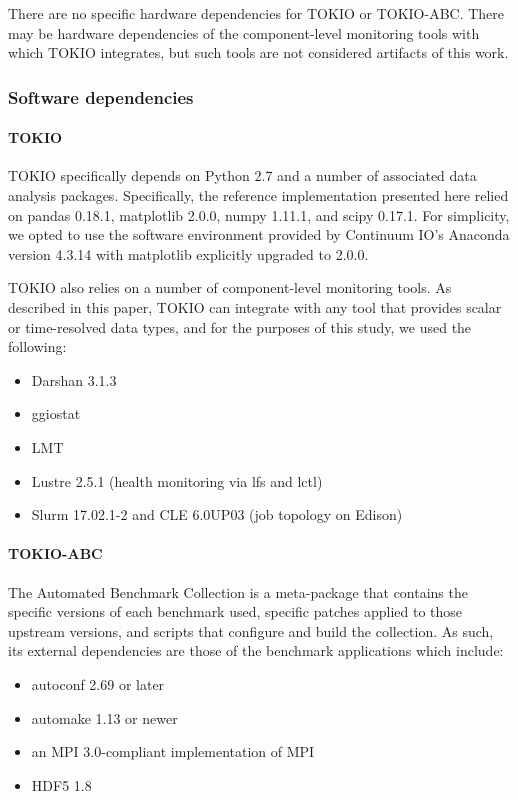There are no specific hardware dependencies for TOKIO or TOKIO-ABC.  There may be hardware dependencies of the component-level monitoring tools with which TOKIO integrates, but such tools are not considered artifacts of this work.

\subsubsection{Software dependencies}

\paragraph{TOKIO}

TOKIO specifically depends on Python 2.7 and a number of associated data analysis packages.  Specifically, the reference implementation presented here relied on pandas 0.18.1, matplotlib 2.0.0, numpy 1.11.1, and scipy 0.17.1.  For simplicity, we opted to use the software environment provided by Continuum IO's Anaconda version 4.3.14 with matplotlib explicitly upgraded to 2.0.0.

TOKIO also relies on a number of component-level monitoring tools.  As described in this paper, TOKIO can integrate with any tool that provides scalar or time-resolved data types, and for the purposes of this study, we used the following:

\begin{itemize}
\item Darshan 3.1.3 %
\item ggiostat
\item LMT %
\item Lustre 2.5.1 (health monitoring via lfs and lctl)
\item Slurm 17.02.1-2 and CLE 6.0UP03 (job topology on Edison)
\end{itemize}

\paragraph{TOKIO-ABC} The Automated Benchmark Collection is a meta-package that contains the specific versions of each benchmark used, specific patches applied to those upstream versions, and scripts that configure and build the collection.  As such, its external dependencies are those of the benchmark applications which include:

\begin{itemize}
\item autoconf 2.69 or later
\item automake 1.13 or newer
\item an MPI 3.0-compliant implementation of MPI
\item HDF5 1.8
\end{itemize}

